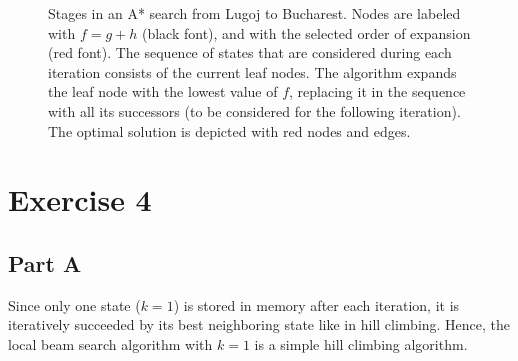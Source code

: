 \begin{figure}
\centering
{}
\caption{Stages in an A* search from Lugoj to Bucharest. Nodes are labeled with $f = g+ h$ (black font), and with the selected order of expansion (red font). The sequence of states that are considered during each iteration consists of the current leaf nodes. The algorithm expands the leaf node with the lowest value of $f$, replacing it in the sequence with all its successors (to be considered for the following iteration). The optimal solution is depicted with red nodes and edges.}
\label{fig:exercise3}
\end{figure} %


\section*{Exercise 4}

\subsection*{Part A}

Since only one state ($k=1$) is stored in memory after each iteration, it is iteratively succeeded by its best neighboring state like in hill climbing. Hence, the local beam search algorithm with $k=1$ is a simple hill climbing algorithm.


